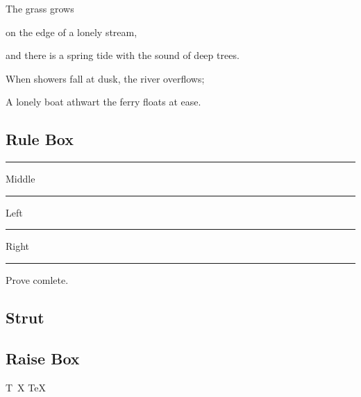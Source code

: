 \documentclass{article}
\begin{document}
        \begin{minipage}[c][2.5cm][t]{5em}
            The grass grows  
        \end{minipage}
        \begin{minipage}[c][2.5cm][c]{8em}
            on the edge of a lonely stream,
        \end{minipage}
        \begin{minipage}[c][2.5cm][b]{15em}
            and there is a spring tide with the sound of deep trees. 
        \end{minipage}
        \begin{minipage}[c][2.5cm][s]{14em}
            \setlength\parskip{0pt plus 1pt}
            When showers fall at dusk, the river overflows; \par
            A lonely boat athwart the ferry floats at ease.
        \end{minipage}
         
        \fbox{\usebox\verbatimbox}\quad\fbox{\usebox\verbatimbox}


        \subsection{Rule Box}
        \rule{1pt}{1em}Middle\rule{1pt}{1em}\par
        Left\rule[0.5ex]{2cm}{0.6pt}Right\par
        \rule[-0.1em]{1em}{1em}Prove comlete. 

        \subsection{Strut}
            \fbox{---}\par
            \fbox{\strut---}\par
            \fbox{\rule{0pt}{2em}---}

        \subsection{Raise Box}
            \mbox{T\hspace{-0.49em}
                \raisebox{-0.5ex}{E}
                \hspace{-0.48em}X}\quad
            \TeX{}
\end{document}
